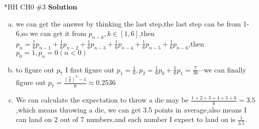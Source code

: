 \documentclass{article}
\newcommand{\solution}{\textbf{\Large Solution}}
\begin{document}
\begin{homeworkProblem}*{BH CH0 \#3}
	\solution \\

	\begin{enumerate}[(a)]
		\item we can get the answer by thinking the last step,the last step can be from 1-6,so we can get it from $p_{n-k},k\in [1,6]$,then $p_n=\frac{1}{6}p_{n-1}+\frac{1}{6}p_{n-2}+\frac{1}{6}p_{n-3}+\frac{1}{6}p_{n-4}+\frac{1}{6}p_{n-5}+\frac{1}{6}p_{n-6}$,then $p_0=1,p_n=0(n<0)$
		\item to figure out $p_7$ I first figure out $p_1=\frac{1}{6},p_2=\frac{1}{6}p_0+\frac{1}{6}p_1=\frac{7}{36}\cdots$we can finally figure out $p_7=\frac{(\frac{7}{6})^6-1}{6}\approx 0.2536$
	\item We can calculate the expectation to throw a die may be $\frac{1+2+3+4+5+6}{6}=3.5$,which means throwing a die, we can get 3.5 points in average,also means I can land on 2 out of 7 numbers,and each number I expect to land on is $\frac{1}{3.5}$.  
	\end{enumerate}
\end{homeworkProblem}
\end{document}
